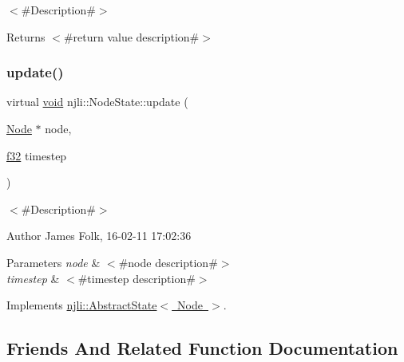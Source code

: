 $<$\#\+Description\#$>$

\begin{DoxyReturn}{Returns}
$<$\#return value description\#$>$ 
\end{DoxyReturn}
\mbox{\label{classnjli_1_1_node_state_a627419875be255906b52e08d63fe61a3}} 
\subsubsection{\texorpdfstring{update()}{update()}}
{\footnotesize\ttfamily virtual \mbox{\hyperlink{_thread_8h_af1e856da2e658414cb2456cb6f7ebc66}{void}} njli\+::\+Node\+State\+::update (\begin{DoxyParamCaption}\item[{\mbox{\hyperlink{classnjli_1_1_node}{Node}} $\ast$}]{node,  }\item[{\mbox{\hyperlink{_util_8h_a5f6906312a689f27d70e9d086649d3fd}{f32}}}]{timestep }\end{DoxyParamCaption})\hspace{0.3cm}{\ttfamily [virtual]}}



$<$\#\+Description\#$>$ 

\begin{DoxyAuthor}{Author}
James Folk, 16-\/02-\/11 17\+:02\+:36
\end{DoxyAuthor}

\begin{DoxyParams}{Parameters}
{\em node} & $<$\#node description\#$>$ \\
\hline
{\em timestep} & $<$\#timestep description\#$>$ \\
\hline
\end{DoxyParams}


Implements \mbox{\hyperlink{classnjli_1_1_abstract_state_aa1d0341a1b1bd83f9b722488680537ad}{njli\+::\+Abstract\+State$<$ Node $>$}}.



\subsection{Friends And Related Function Documentation}
\mbox{\label{classnjli_1_1_node_state_acb96ebb09abe8f2a37a915a842babfac}} 
